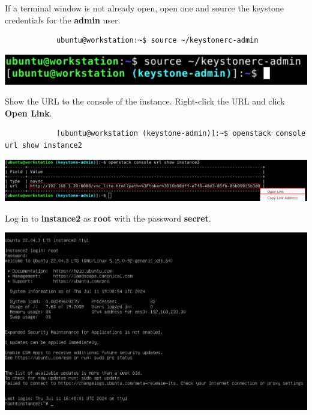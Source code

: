 \documentclass[letterpaper, 12pt]{article}
\begin{document}
\begin{enumerate}
    \begin{labstep}
        If a terminal window is not already open, open one and source the keystone credentials for the \textbf{admin} user.
        \begin{lstlisting}
            ubuntu@workstation:~$ source ~/keystonerc-admin
        \end{lstlisting}

        \begin{center}
            \includegraphics[width=\linewidth]{images/part4/step1.png}
        \end{center}
    \end{labstep}

    \begin{labstep}
        Show the URL to the console of the instance.
        Right-click the URL and click \textbf{Open Link}.
        \begin{lstlisting}
            [ubuntu@workstation (keystone-admin)]:~$ openstack console url show instance2
        \end{lstlisting}

        \begin{center}
            \includegraphics[width=\linewidth]{images/part4/step2.png}
        \end{center}
    \end{labstep}

    \begin{labstep}
        Log in to \textbf{instance2} as \textbf{root} with the password \textbf{secret}.

        \begin{center}
            \includegraphics[width=\linewidth]{images/part4/step3.png}
        \end{center}
    \end{labstep}


\end{enumerate}
\end{document}
